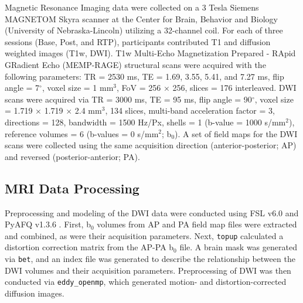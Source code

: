 \documentclass[12pt]{article}
\begin{document}
Magnetic Resonance Imaging data were collected on a 3 Tesla Siemens MAGNETOM Skyra scanner at the Center for Brain, Behavior and Biology (University of Nebraska-Lincoln) utilizing a 32-channel coil. For each of three sessions (Base, Post, and RTP), participants contributed T1 and diffusion weighted images (T1w, DWI). T1w Multi-Echo Magnetization Prepared - RApid GRadient Echo (MEMP-RAGE) structural scans were acquired with the following parameters: TR = 2530 ms, TE = 1.69, 3.55, 5.41, and 7.27 ms, flip angle = 7$^{\circ}$, voxel size = 1 mm$^3$, FoV = 256 $\times$ 256, slices = 176 interleaved. DWI scans were acquired via TR = 3000 ms, TE = 95 ms, flip angle = 90$^{\circ}$, voxel size = 1.719 $\times$ 1.719 $\times$ 2.4 mm$^3$, 134 slices, multi-band acceleration factor = 3, directions = 128, bandwidth = 1500 Hz/Px, shells = 1 (b-value = 1000 s/mm$^2$), reference volumes = 6 (b-values = 0 s/mm$^2$; b$_0$). A set of field maps for the DWI scans were collected using the same acquisition direction (anterior-posterior; AP) and reversed (posterior-anterior; PA).


\subsection{MRI Data Processing}
\label{ssec:meth-mri-proc}
Preprocessing and modeling of the DWI data were conducted using FSL v6.0 \parencite{jenkinson2012Fsl} and PyAFQ v1.3.6 \parencite{kruper2021EvaluatingReliabilityHuman,yeatman2012TractProfilesWhite}. First, b$_0$ volumes from AP and PA field map files were extracted and combined, as were their acquisition parameters. Next, \lstinline{topup} calculated a distortion correction matrix from the AP-PA b$_0$ file. A brain mask was generated via \lstinline{bet}, and an index file was generated to describe the relationship between the DWI volumes and their acquisition parameters. Preprocessing of DWI was then conducted via \lstinline{eddy_openmp}, which generated motion- and distortion-corrected diffusion images.
\end{document}
